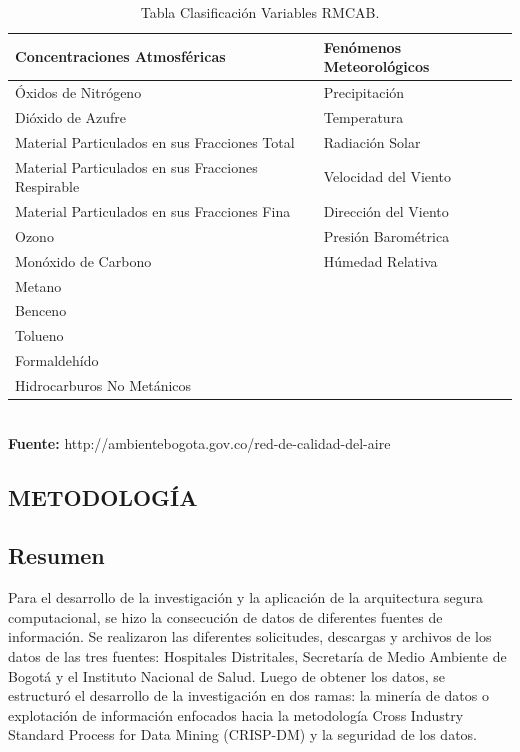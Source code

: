 \documentclass[a4paper,openright,12pt]{book}
\theoremstyle{definition}
\theoremstyle{remark}
\begin{document}
\begin{table}[!ht]
\begin{center}
\caption{Tabla Clasificación Variables RMCAB.}
\resizebox{16.2cm}{!} {
\begin{tabular}{|l|l|}
\hline
Concentraciones Atmosféricas & Fenómenos  Meteorológicos \\
\hline \hline
Óxidos de Nitrógeno & Precipitación \\ \hline
Dióxido de Azufre & Temperatura \\ \hline
Material Particulados en sus Fracciones Total & Radiación Solar \\ \hline
Material Particulados en sus Fracciones Respirable & Velocidad del Viento \\ \hline
Material Particulados en sus Fracciones Fina & Dirección del Viento \\ \hline
Ozono & Presión Barométrica \\ \hline
Monóxido de Carbono & Húmedad Relativa \\ \hline
Metano &  \\ \hline
Benceno &  \\ \hline
Tolueno &  \\ \hline
Formaldehído &  \\ \hline
Hidrocarburos No Metánicos & \\ \hline
\end{tabular}
}
\label{tabla:variables RMCAB}
\\\textbf{Fuente:} http://ambientebogota.gov.co/red-de-calidad-del-aire
\end{center}
\end{table}


\begin{center}
\chapter{METODOLOGÍA}\label{cap.metodologia}
\end{center}
\section{Resumen}
Para el desarrollo de la investigación y la aplicación de la arquitectura segura computacional, se hizo la consecución de datos de diferentes fuentes de información. Se realizaron las diferentes solicitudes, descargas y archivos de los datos de las tres fuentes: Hospitales Distritales, Secretaría de Medio Ambiente de Bogotá y el Instituto Nacional de Salud. Luego de obtener los datos, se estructuró el desarrollo de la investigación en dos ramas: la minería de datos o explotación de información enfocados hacia la metodología Cross Industry Standard Process for Data Mining (CRISP-DM)  y la seguridad de los datos.
\end{document}
